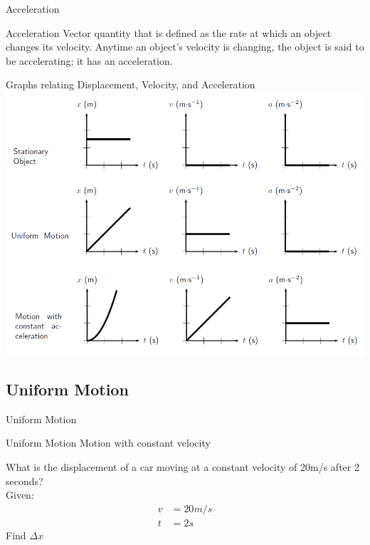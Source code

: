 \documentclass{beamer}
\begin{document}
\begin{frame}{Acceleration}
	\begin{block}{Acceleration}
		Vector quantity that is defined as the rate at which an object changes its velocity. Anytime an object's velocity is changing, the object is said to be accelerating; it has an acceleration.
	\end{block}
\end{frame}

\begin{frame}{Graphs relating Displacement, Velocity, and Acceleration}
	\includegraphics[scale=0.25]{graph.png}\centering
\end{frame}


\subsection{Uniform Motion}

\begin{frame}{Uniform Motion}
	\begin{block}{Uniform Motion}
		Motion with constant velocity
	\end{block}
	\begin{example}
		What is the displacement of a car moving at a constant velocity of 20m/s after 2 seconds? \\
		Given:
		\begin{align*}
			v &= 20 m/s \\
			t &= 2s
		\end{align*}
		Find $ \Delta x$ \\~\\
	\end{example}
\end{frame}
\end{document}
